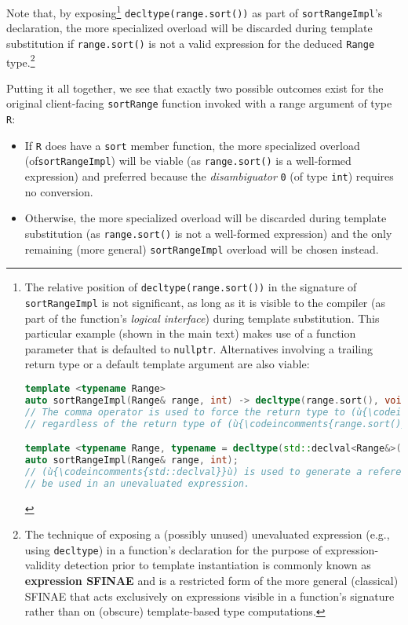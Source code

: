 \noindent Note that, by exposing{\cprotect\footnote{The relative position of
\texttt{decltype(range.sort())} in the signature of
\texttt{sortRangeImpl} is not significant, as long as it is visible to
the compiler (as part of the function's \emph{logical interface})
during template substitution. This particular example (shown in the
main text) makes use of a function parameter that is defaulted to
\texttt{nullptr}. Alternatives involving a trailing return type or a
default template argument are also viable:

\begin{lstlisting}[language=C++, basicstyle={\ttfamily\footnotesize}]
template <typename Range>
auto sortRangeImpl(Range& range, int) -> decltype(range.sort(), void());
// The comma operator is used to force the return type to (ù{\codeincomments{void}}ù),
// regardless of the return type of (ù{\codeincomments{range.sort()}}ù).

template <typename Range, typename = decltype(std::declval<Range&>().sort()>
auto sortRangeImpl(Range& range, int);
// (ù{\codeincomments{std::declval}}ù) is used to generate a reference to (ù{\codeincomments{Range}}ù) that can
// be used in an unevaluated expression.
\end{lstlisting}
}} \texttt{decltype(range.sort())} as part of
\texttt{sortRangeImpl}'s declaration, the more specialized overload will
be discarded during template substitution if \texttt{range.sort()} is
not a valid expression for the deduced \texttt{Range}
type.{\cprotect\footnote{The technique of exposing a (possibly unused)
unevaluated expression (e.g., using \texttt{decltype}) in a function's
declaration for the purpose of expression-validity detection prior to
template instantiation is commonly known as \textbf{expression SFINAE}
and is a restricted form of the more general (classical) SFINAE that acts exclusively on
expressions visible in a function's signature rather than on (obscure)
template-based type computations.}}

Putting it all together, we see that exactly two possible
outcomes exist for the original client-facing \texttt{sortRange} function
invoked with a range argument of type \texttt{R}:

\begin{itemize}
\item{If \texttt{R} does have a \texttt{sort} member function, the more specialized overload (of\linebreak[4] \texttt{sortRangeImpl}) will be viable (as \texttt{range.sort()} is a well-formed expression) and preferred because the \emph{disambiguator} \texttt{0} (of type \texttt{int}) requires no conversion.}
\item{Otherwise, the more specialized overload will be discarded during template substitution (as \texttt{range.sort()} is not a well-formed expression) and the only remaining (more general) \texttt{sortRangeImpl} overload will be chosen instead.}
\end{itemize}

